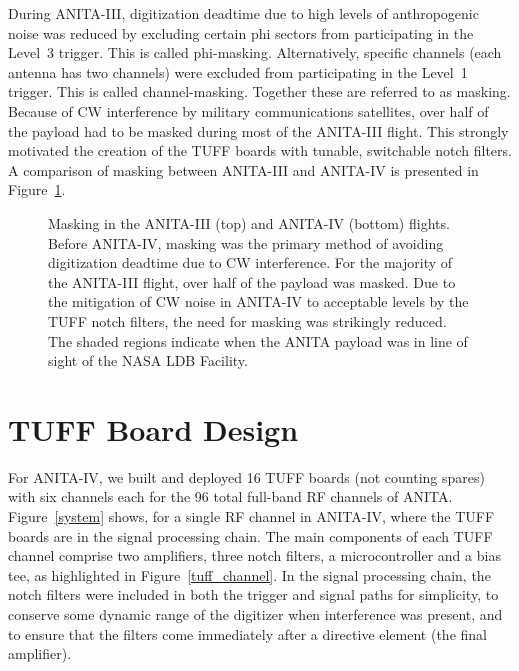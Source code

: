 \documentclass[preprint,12pt]{elsarticle}
\begin{document}
During ANITA-III, digitization deadtime due to high levels of anthropogenic noise was reduced
by excluding
certain phi sectors from participating in the Level~3 trigger. 
This is called phi-masking. 
Alternatively, specific channels (each antenna has two channels) were excluded from participating in the Level~1 trigger. 
This is called channel-masking.
Together these are referred to as masking.
Because of CW interference by military communications
satellites, over half of the payload had to be masked
during most of the ANITA-III flight. 
This strongly motivated the creation of the TUFF
boards with tunable, switchable notch filters. 
A comparison of masking between ANITA-III and ANITA-IV 
is presented in Figure~\ref{phimasking}. 

\begin{figure}[H]
\centering
{}
\caption[]{Masking in the ANITA-III (top) and ANITA-IV (bottom) flights. 
Before ANITA-IV, masking was the primary method of avoiding digitization deadtime
due to CW interference. For the majority of the ANITA-III flight, over half of the payload was masked.
Due to the mitigation of CW noise in ANITA-IV to acceptable levels by the TUFF notch filters, the need for masking was strikingly reduced.
The shaded regions indicate when the 
ANITA payload was in line of sight of the NASA LDB Facility. 
}
\label{phimasking}
\end{figure}

\section{TUFF Board Design}
\label{design} 

For ANITA-IV, we built and deployed 16 TUFF boards (not counting spares) with 
six channels each for the 96 total full-band RF channels of ANITA. 
Figure~\ref{system} shows, for a single RF channel in ANITA-IV, where 
the TUFF boards are in the signal processing chain. 
The main components of each TUFF channel comprise two amplifiers, three notch filters,
a microcontroller and a bias tee, as highlighted in Figure~\ref{tuff_channel}.
In the signal processing chain, the notch filters were included in both the trigger and signal paths for simplicity, 
to conserve some dynamic range of the digitizer when interference was present, and to ensure that the filters come immediately
after a directive element (the final amplifier). 
\end{document}
